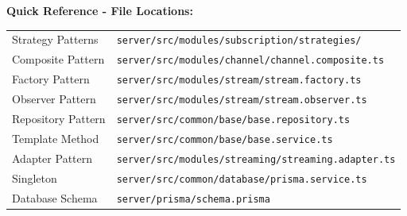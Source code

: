 \documentclass[10pt]{article}
\begin{document}
\noindent
\begin{tcolorbox}[
  colback=light,
  colframe=primary,
  arc=3pt,
  boxrule=1pt,
  before skip=8pt,
  after skip=8pt
]
\small
\textbf{Quick Reference - File Locations:}

\begin{tabular}{ll}
Strategy Patterns & \texttt{server/src/modules/subscription/strategies/} \\
Composite Pattern & \texttt{server/src/modules/channel/channel.composite.ts} \\
Factory Pattern & \texttt{server/src/modules/stream/stream.factory.ts} \\
Observer Pattern & \texttt{server/src/modules/stream/stream.observer.ts} \\
Repository Pattern & \texttt{server/src/common/base/base.repository.ts} \\
Template Method & \texttt{server/src/common/base/base.service.ts} \\
Adapter Pattern & \texttt{server/src/modules/streaming/streaming.adapter.ts} \\
Singleton & \texttt{server/src/common/database/prisma.service.ts} \\
Database Schema & \texttt{server/prisma/schema.prisma} \\
\end{tabular}
\end{tcolorbox}
\end{document}
